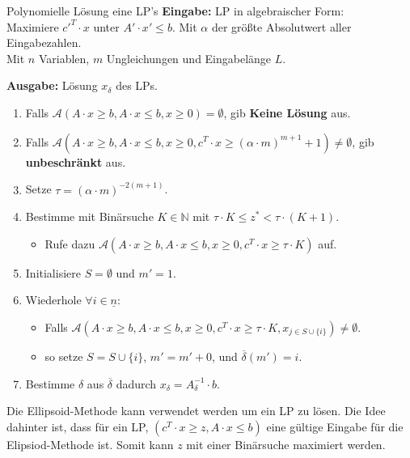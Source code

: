 \documentclass{panikzettel}
\begin{document}
\begin{algo}{Polynomielle Lösung eine LP's}
\textbf{Eingabe:} LP in algebraischer Form: \\
\-\hspace{1em} Maximiere ${c'}^T \cdot x$ unter $A' \cdot x' \leq b$.
Mit $\alpha$ der größte Absolutwert aller Eingabezahlen. \\
Mit $n$ Variablen, $m$ Ungleichungen und Eingabelänge $L$.

\textbf{Ausgabe:} Lösung $x_\delta$ des LPs.
\tcblower
\begin{enumerate}
    \item Falls $\mathcal{A}(A \cdot x \geq b,A \cdot x \leq b, x \geq 0) = \emptyset$, gib \textbf{Keine Lösung} aus.
    \item Falls $\mathcal{A}(A \cdot x \geq b,A \cdot x \leq b, x \geq 0, c^T \cdot x \geq (\alpha \cdot m)^{m+1} +1 ) \neq \emptyset$, gib \textbf{unbeschränkt} aus.
    \item Setze $\tau = (\alpha \cdot m)^{-2(m+1)}$.
    \item Bestimme mit Binärsuche $K \in \mathbb{N}$ mit $\tau \cdot K \leq z^* < \tau \cdot (K+1)$.
    \begin{itemize}
        \item Rufe dazu $\mathcal{A}(A \cdot x \geq b,A \cdot x \leq b, x \geq 0, c^T \cdot x \geq \tau \cdot K)$ auf.
    \end{itemize}
    \item Initialisiere $S = \emptyset$ und $m' = 1$.
    \item Wiederhole $\forall i \in \underline{n}$:
    \begin{itemize}
        \item Falls $\mathcal{A}(A \cdot x \geq b,A \cdot x \leq b, x \geq 0, c^T \cdot x \geq \tau \cdot K, x_{j \in S \cup \{ i \} }) \neq \emptyset$.
        \item so setze $S = S \cup \{ i \}$, $m' = m' +0$, und $\overline{\delta}(m') = i$.
    \end{itemize}
    \item Bestimme $\delta$ aus $\overline{\delta}$ dadurch $x_{\delta} = A_{\delta}^{-1} \cdot b$.
\end{enumerate}
\end{algo}

Die Ellipsoid-Methode kann verwendet werden um ein LP zu lösen. Die Idee dahinter ist, dass für ein LP, $(c^T \cdot x \geq z, A \cdot x \leq b)$ eine gültige Eingabe für die Elipsiod-Methode ist. Somit kann $z$ mit einer Binärsuche maximiert werden.
\end{document}
